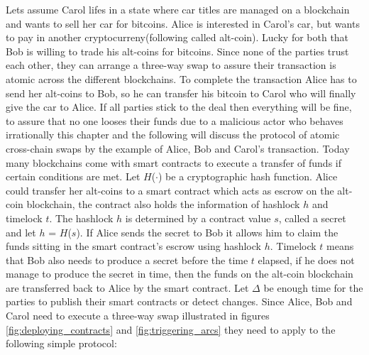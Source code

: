 Lets assume Carol lifes in a state where car titles are managed on a blockchain and wants to sell her car for bitcoins. Alice is interested in Carol's car, but wants to pay in another cryptocurreny(following called alt-coin). Lucky for both that Bob is willing to trade his alt-coins for bitcoins. Since none of the parties trust each other, they can arrange a three-way swap to assure their transaction is atomic across the different blockchains. To complete the transaction Alice has to send her alt-coins to Bob, so he can transfer his bitcoin to Carol who will finally give the car to Alice. If all parties stick to the deal then everything will be fine, to assure that no one looses their funds due to a malicious actor who behaves irrationally this chapter and the following will discuss the protocol of atomic cross-chain swaps by the example of Alice, Bob and Carol's transaction. Today many blockchains come with smart contracts to execute a transfer of funds if certain conditions are met.
Let $H$($\cdot$) be a cryptographic hash function. Alice could transfer her alt-coins to a smart contract which acts as escrow on the alt-coin blockchain, the contract also holds the information of hashlock $h$ and timelock $t$. The hashlock $h$ is determined by a contract value $s$, called a secret and let $h$ = $H$($s$). If Alice sends the secret to Bob it allows him to claim the funds sitting in the smart contract's escrow using hashlock $h$. Timelock $t$ means that Bob also needs to produce a secret before the time $t$ elapsed, if he does not manage to produce the secret in time, then the funds on the alt-coin blockchain are transferred back to Alice by the smart contract. Let $\Delta$ be enough time for the parties to publish their smart contracts or detect changes. Since Alice, Bob and Carol need to execute a three-way swap illustrated in figures \ref{fig:deploying_contracts} and \ref{fig:triggering_arcs} they need to apply to the following simple protocol: \newline


